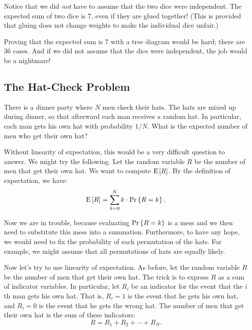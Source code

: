\documentclass[11pt,twoside]{article}
\begin{document}
Notice that we did {\em not} have to assume that the two dice were
independent.  The expected sum of two dice is 7, even if they are
glued together!  (This is provided that gluing does not change weights
to make the individual dice unfair.)

Proving that the expected sum is 7 with a tree diagram would be hard;
there are 36 cases.  And if we did not assume that the dice were
independent, the job would be a nightmare!

\subsection{The Hat-Check Problem}

There is a dinner party where $N$ men check their hats.  The hats are
mixed up during dinner, so that afterward each man receives a random
hat.  In particular, each man gets his own hat with probability
$1/N$.  What is the expected number of men who get their own
hat?

Without linearity of expectation, this would be a very difficult
question to answer.  We might try the following.  Let the random
variable $R$ be the number of men that get their own hat.  We want to
compute $\mathop{\textup{E}}\nolimits\left[R\right]$.  By the definition of expectation, we have:
\[
\mathop{\textup{E}}\nolimits\left[R\right] = \sum_{k=0}^{N} k \cdot \mathop{\textup{Pr}}\nolimits\left\{R = k\right\}.
\]

Now we are in trouble, because evaluating $\mathop{\textup{Pr}}\nolimits\left\{R = k\right\}$ is a mess and
we then need to substitute this mess into a summation.  Furthermore,
to have any hope, we would need to fix the probability of each
permutation of the hats.  For example, we might assume that all
permutations of hats are equally likely.

Now let's try to use linearity of expectation.  As before, let the
random variable $R$ be the number of men that get their own hat.  The
trick is to express $R$ as a sum of indicator variables.  In
particular, let $R_i$ be an indicator for the event that the $i$th
man gets his own hat.  That is, $R_i = 1$ is the event that he gets
his own hat, and $R_i = 0$ is the event that he gets the wrong hat.
The number of men that get their own hat is the sum of these
indicators:
\[
R = R_1 + R_2 + \cdots + R_N.
\]
\end{document}

